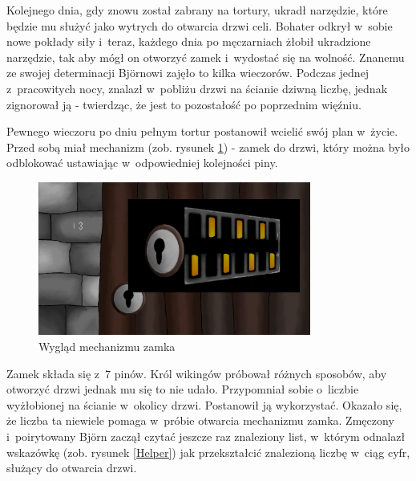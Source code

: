 \documentclass[12pt,a4paper,oneside]{book}
\theoremstyle{definition}
\numberwithin{equation}{chapter}
\begin{document}
\par Kolejnego dnia, gdy znowu został zabrany na tortury, ukradł narzędzie, które będzie mu służyć jako wytrych do otwarcia drzwi celi. Bohater odkrył w~sobie nowe pokłady siły i~teraz, każdego dnia po męczarniach żłobił ukradzione narzędzie, tak aby mógł on otworzyć zamek i~wydostać się na wolność. Znanemu ze swojej determinacji Björnowi zajęło to kilka wieczorów. Podczas jednej z~pracowitych nocy, znalazł w~pobliżu drzwi na ścianie dziwną liczbę, jednak zignorował ją - twierdząc, że jest to pozostałość po poprzednim więźniu.

\par Pewnego wieczoru po dniu pełnym tortur postanowił wcielić swój plan w~życie. Przed sobą miał mechanizm (zob. rysunek \ref{ZamekCeli}) - zamek do drzwi, który można było odblokować ustawiając w~odpowiedniej kolejności piny.

\begin{figure}[hpt!]
        \centering
        \includegraphics[width=0.8\textwidth]{poziomy/binaryconvert.png}
        \caption{Wygląd mechanizmu zamka}
        \label{ZamekCeli}
    \end{figure}
\par Zamek składa się z~7 pinów. Król wikingów próbował różnych sposobów, aby otworzyć drzwi jednak mu się to nie udało. Przypomniał sobie o~liczbie wyżłobionej na ścianie w~okolicy drzwi. Postanowił ją wykorzystać.
Okazało się, że liczba ta niewiele pomaga w~próbie otwarcia mechanizmu zamka. Zmęczony i~poirytowany Björn zaczął czytać jeszcze raz znaleziony list, w~którym odnalazł wskazówkę (zob. rysunek \ref{Helper}) jak przekształcić znalezioną liczbę w~ciąg cyfr, służący do otwarcia drzwi. 
\end{document}
